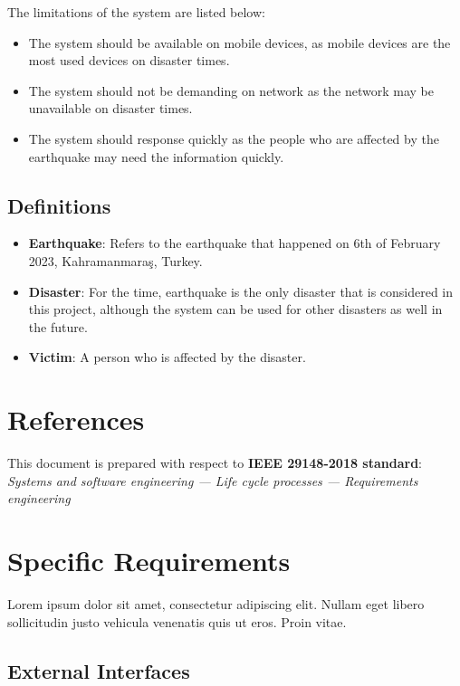 \documentclass[a4paper]{article}
\begin{document}
                The limitations of the system are listed below:
                \begin{itemize}
                    \item The system should be available on mobile devices, as mobile devices are the most used devices on disaster times.
                    \item The system should not be demanding on network as the network may be unavailable on disaster times.
                    \item The system should response quickly as the people who are affected by the earthquake may need the information quickly.
                \end{itemize}

            \subsection{Definitions}
            \begin{itemize}
                \item \textbf{Earthquake}: Refers to the earthquake that happened on 6th of February 2023, Kahramanmaraş, Turkey.
                \item \textbf{Disaster}: For the time, earthquake is the only disaster that is considered in this project, although the system can be used for other disasters as well in the future.
                \item \textbf{Victim}: A person who is affected by the disaster.
            \end{itemize}

    \section{References}

    This document is prepared with respect to \textbf{IEEE 29148-2018 standard}: \textit{Systems and software engineering — Life cycle processes — Requirements engineering}

    \section{Specific Requirements}

    Lorem ipsum dolor sit amet, consectetur adipiscing elit. Nullam eget libero sollicitudin justo vehicula venenatis quis ut eros. Proin vitae.

        \subsection{External Interfaces}
\end{document}

